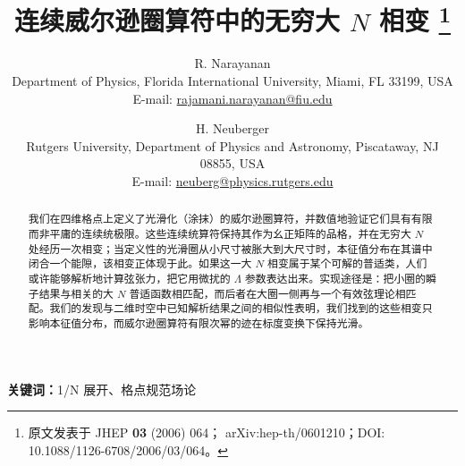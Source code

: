 \documentclass[11pt]{ctexart}
\title{连续威尔逊圈算符中的无穷大 $N$ 相变%
\thanks{原文发表于 JHEP {\bfseries 03} (2006) 064；
arXiv:hep-th/0601210；DOI: 10.1088/1126-6708/2006/03/064。}}
\author{R. Narayanan\\
Department of Physics, Florida International University, Miami,
FL 33199, USA\\
E-mail: \href{mailto:rajamani.narayanan@fiu.edu}{rajamani.narayanan@fiu.edu}
\and H. Neuberger\\
Rutgers University, Department of Physics and Astronomy,
Piscataway, NJ 08855, USA\\
E-mail: \href{mailto:neuberg@physics.rutgers.edu}{neuberg@physics.rutgers.edu}}
\date{}
\begin{document}
\maketitle

\begin{abstract}
我们在四维格点上定义了光滑化（涂抹）的威尔逊圈算符，并数值地验证它们具有有限而非平庸的连续统极限。这些连续统算符保持其作为幺正矩阵的品格，并在无穷大 $N$ 处经历一次相变；当定义性的光滑圈从小尺寸被胀大到大尺寸时，本征值分布在其谱中闭合一个能隙，该相变正体现于此。如果这一大 $N$ 相变属于某个可解的普适类，人们或许能够解析地计算弦张力，把它用微扰的 $\Lambda$ 参数表达出来。实现途径是：把小圈的瞬子结果与相关的大 $N$ 普适函数相匹配，而后者在大圈一侧再与一个有效弦理论相匹配。我们的发现与二维时空中已知解析结果之间的相似性表明，我们找到的这些相变只影响本征值分布，而威尔逊圈算符有限次幂的迹在标度变换下保持光滑。
\end{abstract}

\noindent\textbf{关键词：}1/N 展开、格点规范场论

\bigskip







\end{document}
